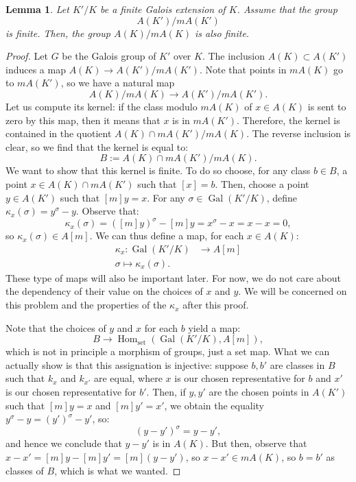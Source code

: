 \documentclass[a4paper, 12pt]{amsart}
\theoremstyle{definition}
\theoremstyle{plain}
\theoremstyle{plain}
\theoremstyle{plain}
\newtheorem{lemma0}[defn0]{Lemma}
\theoremstyle{plain}
\theoremstyle{remark}
\theoremstyle{remark}
\theoremstyle{plain}
\newenvironment{lemma}{ \begin{lemma0}}{\end{lemma0}}
\DeclareMathOperator{\Gal}{Gal}
\DeclareMathOperator{\Hom}{Hom}
\begin{document}
	\begin{lemma}\label{finitereductionlemma}
		Let $K'/K$ be a finite Galois extension of $K$. Assume that the group
		\begin{equation*}
			A(K')/mA(K')
		\end{equation*}
		is finite. Then, the group $A(K)/mA(K)$ is also finite.
	\end{lemma}
	\begin{proof}
		Let $G$ be the Galois group of $K'$ over $K$. The inclusion $A(K)\subset A(K')$ induces a map $A(K)\rightarrow A(K')/mA(K')$. Note that points in $mA(K)$ go to $mA(K')$, so we have a natural map
		\begin{equation*}
			A(K)/mA(K)\rightarrow A(K')/mA(K').
		\end{equation*}
	Let us compute its kernel: if the class modulo $mA(K)$ of $x\in A(K)$ is sent to zero by this map, then it means that $x$ is in $mA(K')$. Therefore, the kernel is contained in the quotient $A(K)\cap mA(K')/mA(K)$. The reverse inclusion is clear, so we find that the kernel is equal to:
	\begin{equation*}
		B:=A(K)\cap mA(K')/mA(K).
	\end{equation*}
	We want to show that this kernel is finite. To do so choose, for any class $b\in B$, a point $x\in A(K)\cap mA(K')$ such that $[x]=b$. Then, choose a point $y\in A(K')$ such that $[m]y=x$. For any $\sigma\in \Gal(K'/K)$, define $\kappa_x(\sigma)=y^\sigma-y$. Observe that:
	\begin{equation*}
		[m]\kappa_x(\sigma)=([m]y)^\sigma-[m]y=x^\sigma-x=x-x=0,
	\end{equation*}
	so $\kappa_x(\sigma)\in A[m]$. We can thus define a map, for each $x\in A(K)$:
	\begin{align*}
		\kappa_x:\Gal(K'/K)&\rightarrow A[m]\\
		\sigma\mapsto \kappa_x(\sigma).
	\end{align*}
	These type of maps will also be important later. For now, we do not care about the dependency of their value on the choices of $x$ and $y$. We will be concerned on this problem and the properties of the $\kappa_x$ after this proof.
	
	Note that the choices of $y$ and $x$ for each $b$ yield a map:
	\begin{equation}\label{homset}
		B\rightarrow \Hom_{\text{set}}(\Gal(K'/K),A[m]),
	\end{equation}
	which is not in principle a morphism of groups, just a set map. What we can actually show is that this assignation is injective: suppose $b,b'$ are classes in $B$ such that $k_x$ and $k_{x'}$ are equal, where $x$ is our chosen representative for $b$ and $x'$ is our chosen representative for $b'$. Then, if $y,y'$ are the chosen points in $A(K')$ such that $[m]y=x$ and $[m]y'=x'$, we obtain the equality $y^\sigma-y=(y')^\sigma-y'$, so:
	\begin{equation*}
		(y-y')^\sigma=y-y',
	\end{equation*}
	and hence we conclude that $y-y'$ is in $A(K)$. But then, observe that $x-x'=[m]y-[m]y'=[m](y-y')$, so $x-x'\in mA(K)$, so $b=b'$ as classes of $B$, which is what we wanted.
	

\end{proof}
\end{document}
